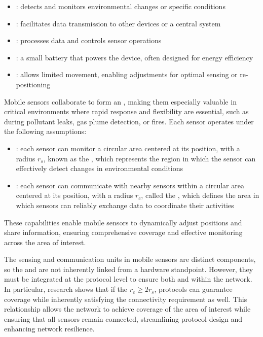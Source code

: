 \documentclass[a4paper, 12pt]{report}
\begin{document}
    \begin{itemize}
        \item {}: detects and monitors environmental changes or specific conditions
        \item {}: facilitates data transmission to other devices or a central system
        \item {}: processes data and controls sensor operations
        \item {}: a small battery that powers the device, often designed for energy efficiency
        \item {}: allows limited movement, enabling adjustments for optimal sensing or re-positioning
    \end{itemize}

    Mobile sensors collaborate to form an , making them especially valuable in critical environments where rapid response and flexibility are essential, such as during pollutant leaks, gas plume detection, or fires. Each sensor operates under the following assumptions:

    \begin{itemize}
        \item {}: each sensor can monitor a circular area centered at its position, with a radius $r_s$, known as the , which represents the region in which the sensor can effectively detect changes in environmental conditions
        \item {}: each sensor can communicate with nearby sensors within a circular area centered at its position, with a radius $r_c$, called the , which defines the area in which sensors can reliably exchange data to coordinate their activities
    \end{itemize}

    These capabilities enable mobile sensors to dynamically adjust positions and share information, ensuring comprehensive coverage and effective monitoring across the area of interest.

    The sensing and communication units in mobile sensors are distinct components, so the  and  are not inherently linked from a hardware standpoint. However, they must be integrated at the protocol level to ensure both  and  within the network. In particular, research shows that if the $r_c \ge 2 r_s$, protocols can guarantee coverage while inherently satisfying the connectivity requirement as well. This relationship allows the network to achieve  coverage of the area of interest while ensuring that all sensors remain connected, streamlining protocol design and enhancing network resilience.
\end{document}
